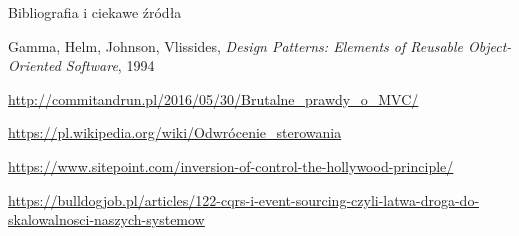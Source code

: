 \begin{frame}{Bibliografia i ciekawe źródła}
  
	\begin{thebibliography}{9}
		
		Gamma, Helm, Johnson, Vlissides, \emph{Design Patterns: Elements of Reusable Object-Oriented Software}, 1994
		
		\url{http://commitandrun.pl/2016/05/30/Brutalne_prawdy_o_MVC/}
		
		\url{https://pl.wikipedia.org/wiki/Odwrócenie\_sterowania}
		
		\url{https://www.sitepoint.com/inversion-of-control-the-hollywood-principle/}
		
		\url{https://bulldogjob.pl/articles/122-cqrs-i-event-sourcing-czyli-latwa-droga-do-skalowalnosci-naszych-systemow}
	
	\end{thebibliography}

\end{frame}

